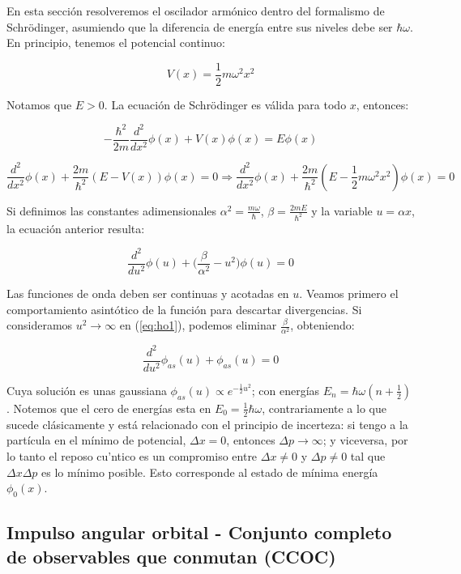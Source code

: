 \documentclass[a4paper]{article}
\begin{document}
En esta secci\'on resolveremos el oscilador arm\'onico dentro del formalismo de Schr\"odinger, asumiendo que la diferencia de energ\'ia entre sus niveles debe ser $\hbar \omega$. En principio, tenemos el potencial continuo:

$$ V(x) = \frac{1}{2}m\omega^{2}x^{2}$$

Notamos que $E > 0$. La ecuaci\'on de Schr\"odinger es v\'alida para todo $x$, entonces:

$$ -\frac{\hbar^{2}}{2m}\frac{d^{2}}{dx^{2}} \phi(x) + V(x)\phi(x) = E\phi(x)$$

$$ \frac{d^{2}}{dx^{2}} \phi(x) + \frac{2m}{\hbar^{2}}(E - V(x))\phi(x) = 0 \Rightarrow \frac{d^{2}}{dx^{2}} \phi(x) + \frac{2m}{\hbar^{2}}(E - \frac{1}{2}m\omega^{2}x^{2})\phi(x) = 0$$

Si definimos las constantes adimensionales $\alpha^{2} = \frac{m\omega}{\hbar}$, $\beta = \frac{2mE}{\hbar^{2}}$ y la variable $u = \alpha x$, la ecuaci\'on anterior resulta:

\begin{equation}
\label{eq:ho1}
\frac{d^{2}}{du^{2}}\phi(u) + \bigg(\frac{\beta}{\alpha^{2}} - u^{2} \bigg)\phi(u) = 0
\end{equation}

Las funciones de onda deben ser continuas y acotadas en $u$. Veamos primero el comportamiento asint\'otico de la funci\'on para descartar divergencias. Si consideramos $u^{2} \rightarrow \infty$ en (\ref{eq:ho1}), podemos eliminar $\frac{\beta}{\alpha^{2}}$, obteniendo:

\begin{equation}
\label{eq:ho2}
\frac{d^{2}}{du^{2}}\phi_{as}(u) + \phi_{as}(u) = 0
\end{equation}

Cuya soluci\'on es unas gaussiana $\phi_{as}(u) \propto e^{-\frac{1}{2}u^{2}}$; con energ\'ias $E_{n} = \hbar \omega (n + \frac{1}{2})$. Notemos que el cero de energ\'ias esta en $E_{0} = \frac{1}{2}\hbar \omega$, contrariamente a lo que sucede cl\'asicamente y est\'a relacionado con el principio de incerteza: si tengo a la part\'icula en el m\'inimo de potencial, $\Delta x = 0$, entonces $\Delta p \rightarrow \infty$; y viceversa, por lo tanto el reposo cu\a'ntico es un compromiso entre $\Delta x \neq 0$ y $\Delta p \neq 0$ tal que $\Delta x \Delta p$ es lo m\'inimo posible. Esto corresponde al estado de m\'inima energ\'ia $\phi_{0}(x)$.\\

\subsection{Impulso angular orbital - Conjunto completo de observables que conmutan (CCOC)}
\end{document}
